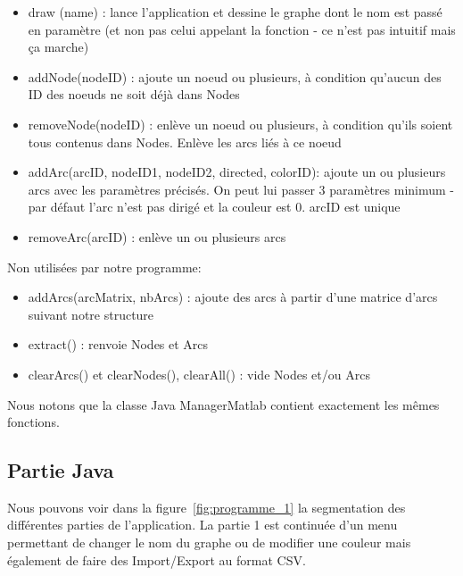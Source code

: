 \documentclass[pidr]{tnreport}
\begin{document}
\begin{itemize}
\item draw (name) : lance l’application et dessine le graphe dont le nom est passé en paramètre (et non pas celui appelant la fonction - ce n’est pas intuitif mais ça marche)
\item addNode(nodeID) : ajoute un noeud ou plusieurs, à condition qu’aucun des ID des noeuds ne soit déjà dans Nodes
\item removeNode(nodeID) : enlève un noeud ou plusieurs, à condition qu’ils soient tous contenus dans Nodes. Enlève les arcs liés à ce noeud
\item addArc(arcID, nodeID1, nodeID2, directed, colorID): ajoute un ou plusieurs arcs avec les paramètres précisés. On peut lui passer 3 paramètres minimum - par défaut l’arc n’est pas dirigé et la couleur est 0. arcID est unique
\item removeArc(arcID) : enlève un ou plusieurs arcs
\end{itemize}

Non utilisées par notre programme:

\begin{itemize}
\item addArcs(arcMatrix,  nbArcs) : ajoute des arcs à partir d’une matrice d’arcs suivant notre structure
\item extract() : renvoie Nodes et Arcs
\item clearArcs() et clearNodes(), clearAll()  : vide Nodes et/ou Arcs
\end{itemize}


Nous notons que la classe Java ManagerMatlab contient exactement les mêmes fonctions.

\subsection{Partie Java}

Nous pouvons voir dans la figure~\ref{fig:programme_1} la segmentation des différentes parties de l'application. La partie 1 est continuée d'un menu permettant de changer le nom du graphe ou de modifier une couleur mais également de faire des Import/Export au format CSV.
\end{document}
